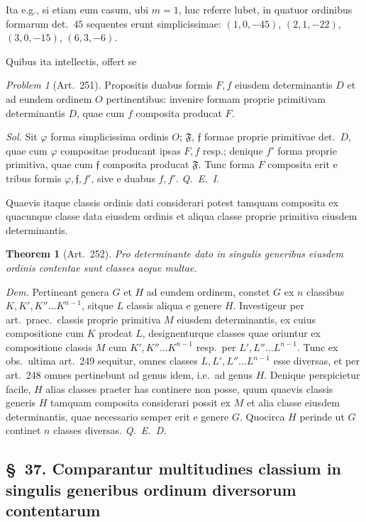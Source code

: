 \documentclass[12pt,a4paper]{article}
\theoremstyle{plain}
\newtheorem{theorem}{Theorem}[section]
\theoremstyle{definition}
\theoremstyle{remark}
\theoremstyle{problemstyle}
\newtheorem{problem}{Problem}[section]
\begin{document}
Ita e.g., si etiam eum casum, ubi $m = 1$, huc referre lubet, in quatuor ordinibus formarum det.\ $45$ sequentes erunt simplicissimae: $(1, 0, -45)$, $(2, 1, -22)$, $(3, 0, -15)$, $(6, 3, -6)$.

Quibus ita intellectis, offert se

\begin{problem}[Art.\ 251]
Propositis duabus formis $F, f$ eiusdem determinantis $D$ et ad eundem ordinem $O$ pertinentibus: invenire formam proprie primitivam determinantis $D$, quae cum $f$ composita producat $F$.
\end{problem}

\emph{Sol.} Sit $\varphi$ forma simplicissima ordinis $O$; $\mathfrak{F}$, $\mathfrak{f}$ formae proprie primitivae det.\ $D$, quae cum $\varphi$ compositae producant ipsas $F, f$ resp.; denique $f'$ forma proprie primitiva, quae cum $\mathfrak{f}$ composita producat $\mathfrak{F}$. Tunc forma $F$ composita erit e tribus formis $\varphi, \mathfrak{f}, f'$, sive e duabus $f, f'$. \emph{Q.\ E.\ I.}

Quaevis itaque classis ordinis dati considerari potest tamquam composita ex quacunque classe data eiusdem ordinis et aliqua classe proprie primitiva eiusdem determinantis.


\begin{theorem}[Art.\ 252]
Pro determinante dato in singulis generibus eiusdem ordinis contentae sunt classes aeque multae.
\end{theorem}

\emph{Dem.} Pertineant genera $G$ et $H$ ad eundem ordinem, constet $G$ ex $n$ classibus $K, K', K'' \ldots K^{n-1}$, sitque $L$ classis aliqua e genere $H$. Investigeur per art.\ praec.\ classis proprie primitiva $M$ eiusdem determinantis, ex cuius compositione cum $K$ prodeat $L$, designenturque classes quae oriuntur ex compositione classis $M$ cum $K', K'' \ldots K^{n-1}$ resp.\ per $L', L'' \ldots L^{n-1}$. Tunc ex obs.\ ultima art.\ 249 sequitur, omnes classes $L, L', L'' \ldots L^{n-1}$ esse diversas, et per art.\ 248 omnes pertinebunt ad genus idem, i.e.\ ad genus $H$. Denique perspicietur facile, $H$ alias classes praeter has continere non posse, quum quaevis classis generis $H$ tamquam composita considerari possit ex $M$ et alia classe eiusdem determinantis, quae necessario semper erit e genere $G$. Quocirca $H$ perinde ut $G$ continet $n$ classes diversas. \emph{Q.\ E.\ D.}


\subsection*{\S\ 37. Comparantur multitudines classium in singulis generibus ordinum diversorum contentarum}
\end{document}

